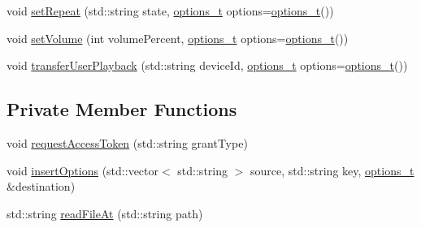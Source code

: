 \begin{DoxyCompactItemize}
\item 
void \mbox{\hyperlink{class_spotify_a_p_i_ab800b2fa5d52fa5addb7b5f999392dd5}{set\+Repeat}} (std\+::string state, \mbox{\hyperlink{_spotify_a_p_i_8h_a0ff5cac1a4007bb330b7d9939650c283}{options\+\_\+t}} options=\mbox{\hyperlink{_spotify_a_p_i_8h_a0ff5cac1a4007bb330b7d9939650c283}{options\+\_\+t}}())
\item 
void \mbox{\hyperlink{class_spotify_a_p_i_adf7901eeb17f3b94ae8307aaf6ffe307}{set\+Volume}} (int volume\+Percent, \mbox{\hyperlink{_spotify_a_p_i_8h_a0ff5cac1a4007bb330b7d9939650c283}{options\+\_\+t}} options=\mbox{\hyperlink{_spotify_a_p_i_8h_a0ff5cac1a4007bb330b7d9939650c283}{options\+\_\+t}}())
\item 
void \mbox{\hyperlink{class_spotify_a_p_i_a46ef00092fadc47a398e5600facfb295}{transfer\+User\+Playback}} (std\+::string device\+Id, \mbox{\hyperlink{_spotify_a_p_i_8h_a0ff5cac1a4007bb330b7d9939650c283}{options\+\_\+t}} options=\mbox{\hyperlink{_spotify_a_p_i_8h_a0ff5cac1a4007bb330b7d9939650c283}{options\+\_\+t}}())
\end{DoxyCompactItemize}
\subsection*{Private Member Functions}
\begin{DoxyCompactItemize}
\item 
void \mbox{\hyperlink{class_spotify_a_p_i_ac7b630b1b98e6cfb047e7f107e862673}{request\+Access\+Token}} (std\+::string grant\+Type)
\item 
void \mbox{\hyperlink{class_spotify_a_p_i_ac6e0064f7fb02813ab423f4c9f5d042e}{insert\+Options}} (std\+::vector$<$ std\+::string $>$ source, std\+::string key, \mbox{\hyperlink{_spotify_a_p_i_8h_a0ff5cac1a4007bb330b7d9939650c283}{options\+\_\+t}} \&destination)
\item 
std\+::string \mbox{\hyperlink{class_spotify_a_p_i_a0a20f7e551ea8c9bdd9046aecb56cf8f}{read\+File\+At}} (std\+::string path)
\end{DoxyCompactItemize}
